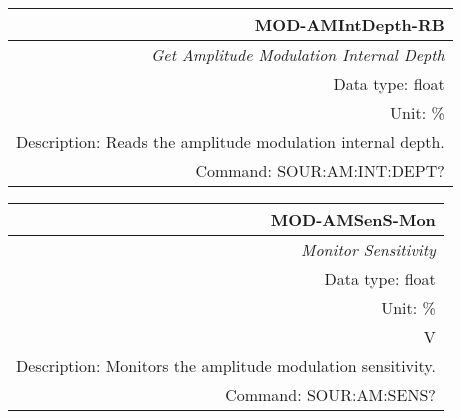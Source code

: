 \documentclass[openany]{article}
\begin{document}
		\begin{tabular}{N}
			\hline
			\bfseries MOD-AMIntDepth-RB \\ \hline
			\emph{Get Amplitude Modulation Internal Depth} \\
			Data type: float \\
			Unit: \% \\
			Description: Reads the amplitude modulation internal depth. \\
			Command: SOUR:AM:INT:DEPT? \\

		\end{tabular}
%
		\begin{tabular}{N}
			\hline
			\bfseries MOD-AMSenS-Mon \\ \hline
			\emph{Monitor Sensitivity} \\
			Data type: float \\
			Unit: \%\\V \\
			Description: Monitors the amplitude modulation sensitivity. \\
			Command: SOUR:AM:SENS? \\

		\end{tabular}
%
\end{document}
